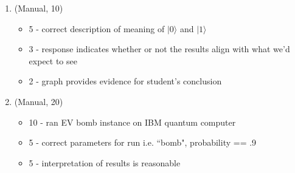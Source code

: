 \documentclass[12pt]{article}
\begin{document}
\begin{enumerate}[font=\bfseries]
\begin{itemize}
    \end{itemize}
    \item (Manual, 10)
    \begin{itemize}
        \item 5 - correct description of meaning of $|0\rangle$ and $|1\rangle$
        \item 3 - response indicates whether or not the results align with what we'd expect to see
        \item 2 - graph provides evidence for student's conclusion
    \end{itemize}
    \item (Manual, 20)
    \begin{itemize}
        \item 10 - ran EV bomb instance on IBM quantum computer
        \item 5 - correct parameters for run i.e. ``bomb", probability == .9
        \item 5 - interpretation of results is reasonable
    \end{itemize}
    
    
\end{enumerate}
\end{document}
